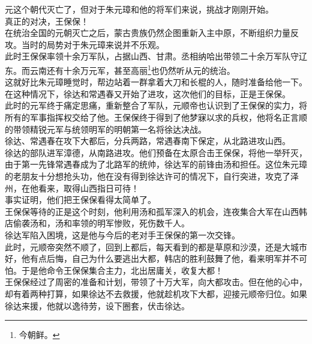 \begin{multicols}{\theparacolNo}
元这个朝代灭亡了，但对于朱元璋和他的将军们来说，挑战才刚刚开始。\\

真正的对决，王保保！\\

在统治全国的元朝灭亡之后，蒙古贵族仍然企图重新入主中原，不断组织力量反攻。当时的局势对于朱元璋来说并不乐观。\\

此时王保保率领十余万军队，占据山西、甘肃。丞相纳哈出带领二十余万军队守辽东。而云南还有十余万元军，甚至高丽\footnote{今朝鲜。}也仍然听从元的统治。\\

这就好比朱元璋睡觉时，帮边站着一群拿着大刀和长棍的人，随时准备给他一下。\\

在这种情况下，徐达和常遇春又开始了进攻，这次他们的目标，正是王保保。\\

此时的元军终于痛定思痛，重新整合了军队，元顺帝也认识到了王保保的实力，将所有的军事指挥权交给了他。王保保终于得到了他梦寐以求的兵权，他将名正言顺的带领精锐元军与统领明军的明朝第一名将徐达决战。\\

徐达、常遇春在攻下大都后，分兵两路，常遇春南下保定，从北路进攻山西。\\

徐达的部队进军漳德，从南路进攻。他们预备在太原合击王保保，将他一举歼灭，由于第一先锋常遇春成为了北路军的统帅，徐达军的前锋由汤和担任。这位朱元璋的老朋友十分想抢头功，他在没有得到徐达许可的情况下，自行突进，攻克了泽州，在他看来，取得山西指日可待！\\

事实证明，他们把王保保看得太简单了。\\

王保保等待的正是这个时刻，他利用汤和孤军深入的机会，连夜集合大军在山西韩店偷袭汤和，汤和率领的明军惨败，死伤数千人。\\

徐达军陷入困境，这是他与今后的老对手王保保的第一次交锋。\\

此时，元顺帝突然不顺了，回到上都后，每天看到的都是草原和沙漠，还是大城市好，他有点后悔，自己为什么要逃出大都，韩店的胜利鼓舞了他，看来明军并不可怕。于是他命令王保保集合主力，北出居庸关，收复大都！\\

王保保经过了周密的准备和计划，带领了十万大军，向大都攻击。但在他的心中，却有着两种打算，如果徐达不去救援，他就趁机攻下大都，迎接元顺帝归位。如果徐达来援，他就以逸待劳，设下圈套，伏击徐达。\\


\end{multicols}
